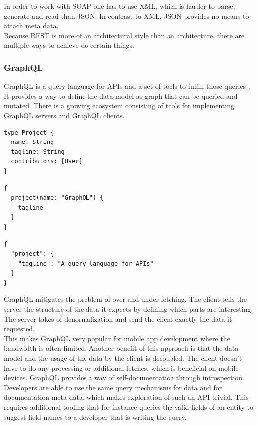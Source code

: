 In order to work with SOAP one has to use XML, which is harder to parse, generate and read than JSON. In contrast to XML, JSON provides no means to attach meta data. \\
Because REST is more of an architectural style than an architecture, there are multiple ways to achieve do certain things.

\subsubsection{GraphQL}\label{graphql}
GraphQL is a query language for APIs and a set of tools to fulfill those queries \citep{graphql}. It provides a way to define the data model as graph that can be queried and mutated. There is a growing ecosystem consisting of tools for implementing GraphQL servers and GraphQL clients.

\lstset{language=GraphQL}
\begin{lstlisting}[caption=Simple data model in the GraphQL data description language.]
type Project {
  name: String
  tagline: String
  contributors: [User]
}
\end{lstlisting}
\lstset{language=GraphQL}
\begin{lstlisting}[caption=Example of a GraphQL query to fetch the tagline of a certain project.]
{
  project(name: "GraphQL") {
    tagline
  }
}
\end{lstlisting}
\lstset{language=JSON}
\begin{lstlisting}[caption=Response of the GraphQL server in JSON.]
{
  "project": {
    "tagline": "A query language for APIs"
  }
}\end{lstlisting}

GraphQL mitigates the problem of over and under fetching. The client tells the server the structure of the data it expects by defining which parts are interesting. The server takes of denormalization and send the client exactly the data it requested. \\ This makes GraphQL very popular for mobile app development where the bandwidth is often limited. Another benefit of this approach is that the data model and the usage of the data by the client is decoupled. The client doesn't have to do any processing or additional fetches, which is beneficial on mobile devices.
GraphQL provides a way of self-documentation through introspection. Developers are able to use the same query mechanisms for data and for documentation meta data, which makes exploration of such an API trivial. This requires additional tooling that for instance queries the valid fields of an entity to suggest field names to a developer that is writing the query.

